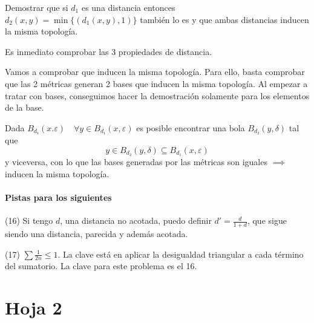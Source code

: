 \begin{problem}[15]
Demostrar que si $d_1$ es una distancia entonces $d_2(x, y) = \min\{ (d_1(x, y), 1)\}$ también lo es y que ambas distancias inducen la misma topología.
\solution

Es inmediato comprobar las 3 propiedades de distancia.

Vamos a comprobar que inducen la misma topología. Para ello, basta comprobar que las 2 métricas generan 2 bases que inducen la misma topología. Al empezar a tratar con bases, conseguimos hacer la demostración solamente para los elementos de la base.

Dada $B_{d₁}(x.ε)\quad ∀y∈B_{d₁}(x,ε)$ es posible encontrar una bola $B_{d₂}(y,δ)$ tal que $$y∈B_{d₂}(y,δ) \subseteq B_{d₁}(x,ε)$$ y viceversa, con lo que las bases generadas por las métricas son iguales $\implies$ inducen la misma topología.
\end{problem}

\paragraph{Pistas para los siguientes}

(16) Si tengo $d$, una distancia no acotada, puedo definir $d'=\frac{d}{1+d}$, que sigue siendo una distancia, parecida y además acotada.

(17) $\sum \frac{1}{2n} \leq 1$. La clave está en aplicar la desigualdad triangular a cada término del sumatorio. La clave para este problema es el 16.



\section{Hoja 2}

